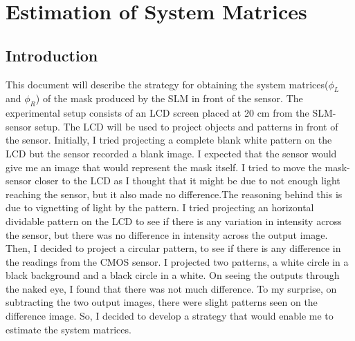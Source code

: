 \chapter{Estimation of System Matrices}

\section{Introduction}
This document will describe the strategy for obtaining the system matrices(${\phi}_L$ and ${\phi}_R$) of the mask produced by the SLM in front of the sensor. The experimental setup consists of an LCD screen placed at 20 cm from the SLM-sensor setup. The LCD will be used to project objects and patterns in front of the sensor. Initially, I tried projecting a complete blank white pattern on the LCD but the sensor recorded a blank image. I expected that the sensor would give me an image that would represent the mask itself. I tried to move the mask-sensor closer to the LCD as I thought that it might be due to not enough light reaching the sensor, but it also made no difference.The reasoning behind this is due to vignetting of light by the pattern. I tried projecting an horizontal dividable pattern on the LCD to see if there is any variation in intensity across the sensor, but there was no difference in intensity across the output image. Then, I decided to project a circular pattern, to see if there is any difference in the readings from the CMOS sensor. I projected two patterns, a white circle in a black background and a black circle in a white. On seeing the outputs through the naked eye, I found that there was not much difference. To my surprise, on subtracting the two output images, there were slight patterns seen on the difference image. So, I decided to develop a strategy that would enable me to estimate the system matrices.
